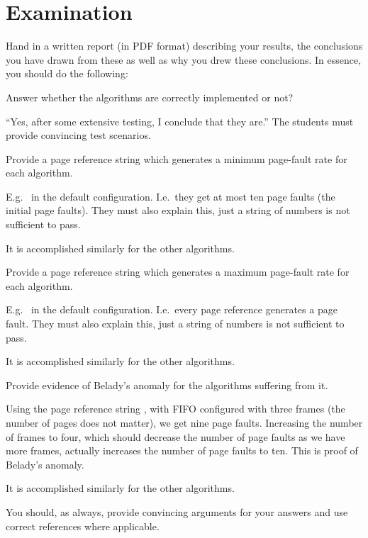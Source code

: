 \documentclass[a4paper,nocourse]{miunasgn}
\begin{document}
\section{Examination}
\label{sec:Examination}
Hand in a written report (in PDF format) describing your results, the 
conclusions you have drawn from these as well as why you drew these 
conclusions.
In essence, you should do the following:
\begin{questions}
	\question Answer whether the algorithms are correctly implemented or not?
	\begin{solution}
    ``Yes, after some extensive testing, I conclude that they are.''
		The students must provide convincing test scenarios.
	\end{solution}

	\question Provide a page reference string which generates a minimum 
	page-fault rate for each algorithm.
	\begin{solution}
    E.g.\  in the default 
    configuration.
    I.e.\ they get at most ten page faults (the initial page faults).
    They must also explain this, just a string of numbers is not sufficient to 
    pass.

    It is accomplished similarly for the other algorithms.
  \end{solution}

	\question Provide a page reference string which generates a maximum 
	page-fault rate for each algorithm.
	\begin{solution}
    E.g.\  in the default 
    configuration.
    I.e.\ every page reference generates a page fault.
    They must also explain this, just a string of numbers is not sufficient to 
    pass.

    It is accomplished similarly for the other algorithms.
	\end{solution}

	\question Provide evidence of Belady's anomaly for the algorithms suffering 
	from it.
	\begin{solution}
    Using the page reference string , with FIFO 
    configured with three frames (the number of pages does not matter), we get 
    nine page faults.
		Increasing the number of frames to four, which should decrease the number 
		of page faults as we have more frames, actually increases the number of 
		page faults to ten.
		This is proof of Belady's anomaly.

    It is accomplished similarly for the other algorithms.
	\end{solution}
\end{questions}
You should, as always, provide convincing arguments for your answers and use 
correct references where applicable.
\end{document}
